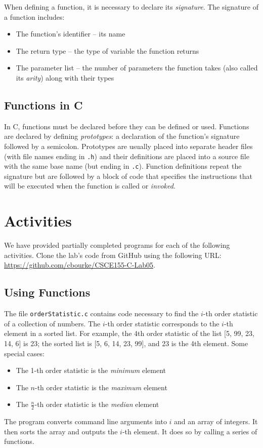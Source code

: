\documentclass[12pt]{scrartcl}
\begin{document}
When defining a function, it is necessary to declare its \emph{signature}.  
The signature of a function includes:
\begin{itemize}
  \item The function's identifier -- its name 
  \item The return type -- the type of variable the function returns
  \item The parameter list -- the number of parameters the function takes 
	(also called its \emph{arity}) along with their types 
\end{itemize}

\subsection{Functions in C}

In C, functions must be declared before they can be defined or used.  
Functions are declared by defining \emph{prototypes}: a 
declaration of the function's signature followed by a semicolon.  
Prototypes are usually placed into separate header files (with file
names ending in \texttt{.h}) and their definitions are
placed into a source file with the same base name (but ending in 
\texttt{.c}).  Function definitions repeat the signature 
but are followed by a block of code that specifies the 
instructions that will be executed when the function is called or
\emph{invoked}.

\section{Activities}

We have provided partially completed programs for each of the 
following activities.  Clone the lab's code from GitHub using the 
following URL: \url{https://github.com/cbourke/CSCE155-C-Lab05}.

\subsection{Using Functions}

The file \texttt{orderStatistic.c} contains code necessary
to find the $i$-th order statistic of a collection of numbers.   
The $i$-th order statistic corresponds to the $i$-th element in a 
sorted list.  For example, the 4th order statistic of the list 
[5, 99, 23, 14, 6] is 23; the sorted list is [5, 6, 14, 23, 99], 
and 23 is the 4th element.  Some special cases:
\begin{itemize}
  \item The 1-th order statistic is the \emph{minimum} element
  \item The $n$-th order statistic is the \emph{maximum} element
  \item The $\frac{n}{2}$-th order statistic is the \emph{median} element
\end{itemize}
The program converts command line arguments into $i$ and an
array of integers.  It then sorts the array and outputs the $i$-th 
element.  It does so by calling a series of functions.
\end{document}

